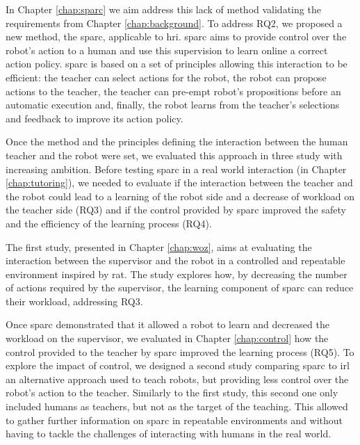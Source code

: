 In Chapter \ref{chap:sparc} we aim address this lack of method validating the requirements from Chapter \ref{chap:background}. To address RQ2, we proposed a new method, the \acrfull{sparc}, applicable to \gls{hri}. \gls{sparc} aims to provide control over the robot's action to a human and use this supervision to learn online a correct action policy. \gls{sparc} is based on a set of principles allowing this interaction to be efficient: the teacher can select actions for the robot, the robot can propose actions to the teacher, the teacher can pre-empt robot's propositions before an automatic execution and, finally, the robot learns from the teacher's selections and feedback to improve its action policy.

Once the method and the principles defining the interaction between the human teacher and the robot were set, we evaluated this approach in three study with increasing ambition. Before testing \gls{sparc} in a real world interaction (in Chapter \ref{chap:tutoring}), we needed to evaluate if the interaction between the teacher and the robot could lead to a learning of the robot side and a decrease of workload on the teacher side (RQ3) and if the control provided by \gls{sparc} improved the safety and the efficiency of the learning process (RQ4).

The first study, presented in Chapter \ref{chap:woz}, aims at evaluating the interaction between the supervisor and the robot in a controlled and repeatable environment inspired by \gls{rat}. The study explores how, by decreasing the number of actions required by the supervisor, the learning component of \gls{sparc} can reduce their workload, addressing RQ3.

Once \gls{sparc} demonstrated that it allowed a robot to learn and decreased the workload on the supervisor, we evaluated in Chapter \ref{chap:control} how the control provided to the teacher by \gls{sparc} improved the learning process (RQ5). To explore the impact of control, we designed a second study comparing \gls{sparc} to \gls{irl} an alternative approach used to teach robots, but providing less control over the robot's action to the teacher. Similarly to the first study, this second one only included humans as teachers, but not as the target of the teaching. This allowed to gather further information on \gls{sparc} in repeatable environments and without having to tackle the challenges of interacting with humans in the real world.

